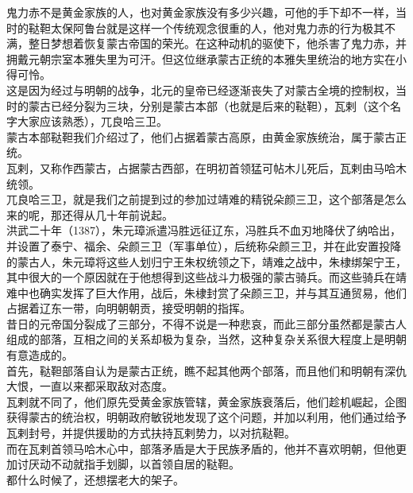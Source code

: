 \begin{multicols}{\theparacolNo}
鬼力赤不是黄金家族的人，也对黄金家族没有多少兴趣，可他的手下却不一样，当时的鞑靼太保阿鲁台就是这样一个传统观念很重的人，他对鬼力赤的行为极其不满，整日梦想着恢复蒙古帝国的荣光。在这种动机的驱使下，他杀害了鬼力赤，并拥戴元朝宗室本雅失里为可汗。但这位继承蒙古正统的本雅失里统治的地方实在小得可怜。\\

这是因为经过与明朝的战争，北元的皇帝已经逐渐丧失了对蒙古全境的控制权，当时的蒙古已经分裂为三块，分别是蒙古本部（也就是后来的鞑靼），瓦剌（这个名字大家应该熟悉），兀良哈三卫。\\

蒙古本部鞑靼我们介绍过了，他们占据着蒙古高原，由黄金家族统治，属于蒙古正统。\\

瓦剌，又称作西蒙古，占据蒙古西部，在明初首领猛可帖木儿死后，瓦剌由马哈木统领。\\

兀良哈三卫，就是我们之前提到过的参加过靖难的精锐朵颜三卫，这个部落是怎么来的呢，那还得从几十年前说起。\\

洪武二十年（1387），朱元璋派遣冯胜远征辽东，冯胜兵不血刃地降伏了纳哈出，并设置了泰宁、福余、朵颜三卫（军事单位），后统称朵颜三卫，并在此安置投降的蒙古人，朱元璋将这些人划归宁王朱权统领之下，靖难之战中，朱棣绑架宁王，其中很大的一个原因就在于他想得到这些战斗力极强的蒙古骑兵。而这些骑兵在靖难中也确实发挥了巨大作用，战后，朱棣封赏了朵颜三卫，并与其互通贸易，他们占据着辽东一带，向明朝朝贡，接受明朝的指挥。\\

昔日的元帝国分裂成了三部分，不得不说是一种悲哀，而此三部分虽然都是蒙古人组成的部落，互相之间的关系却极为复杂，当然，这种复杂关系很大程度上是明朝有意造成的。\\

首先，鞑靼部落自认为是蒙古正统，瞧不起其他两个部落，而且他们和明朝有深仇大恨，一直以来都采取敌对态度。\\

瓦剌就不同了，他们原先受黄金家族管辖，黄金家族衰落后，他们趁机崛起，企图获得蒙古的统治权，明朝政府敏锐地发现了这个问题，并加以利用，他们通过给予瓦剌封号，并提供援助的方式扶持瓦剌势力，以对抗鞑靼。\\

而在瓦剌首领马哈木心中，部落矛盾是大于民族矛盾的，他并不喜欢明朝，但他更加讨厌动不动就指手划脚，以首领自居的鞑靼。\\

都什么时候了，还想摆老大的架子。\\


\end{multicols}

